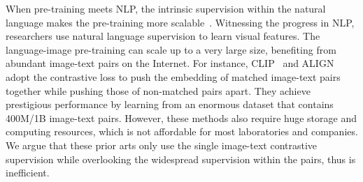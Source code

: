 When pre-training meets NLP, the intrinsic supervision within the natural language makes the pre-training more scalable~\citep{devlin2018bert, radford2019language, brown2020language}. 
Witnessing the progress in NLP, researchers use natural language supervision to learn visual features.
The language-image pre-training can scale up to a very large size, benefiting from abundant image-text pairs on the Internet.
For instance, CLIP~\citep{radford2021learning} and ALIGN~\citep{jia2021scaling} adopt the contrastive loss to push the embedding of matched image-text pairs together while pushing those of non-matched pairs apart. They achieve prestigious performance by learning from an enormous dataset that contains 400M/1B image-text pairs. 
However, these methods also require huge storage and computing resources, which is not affordable for most laboratories and companies. 
We argue that these prior arts only use the single image-text contrastive supervision while overlooking the widespread supervision within the pairs, thus is inefficient.





